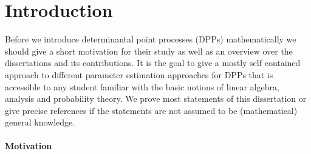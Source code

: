 \chapter*{Introduction}
\manualmark {}









Before we introduce determinantal point processes (DPPs) mathematically we should give a short motivation for their study as well as an overview over the dissertations and its contributions. It is the goal to give a mostly self contained approach to different parameter estimation approaches for DPPs that is accessible to any student familiar with the basic notions of linear algebra, analysis and probability theory. We prove most statements of this dissertation or give precise references if the statements are not assumed to be (mathematical) general knowledge.

\subsubsection*{Motivation}

